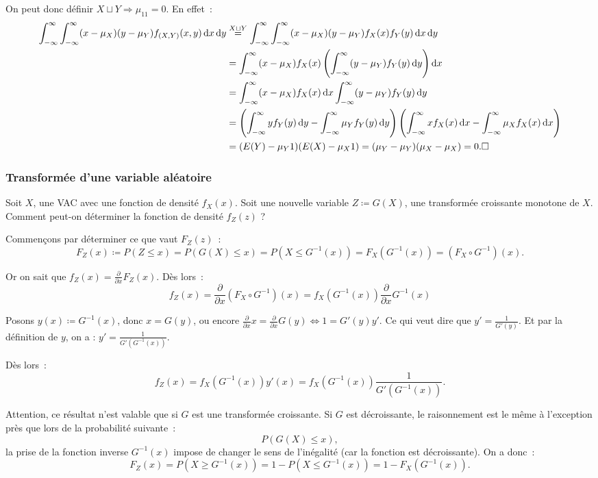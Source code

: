 \documentclass{article}
\renewcommand{\pd}[1]{\frac {\partial}{\partial #1}}
\begin{document}
			On peut donc définir $X \sqcup Y \Rightarrow \mu_{11} = 0$. En effet~:
			\begin{align*}
				\int_{-\infty}^\infty\int_{-\infty}^\infty(x-\mu_X)(y-\mu_Y)f_{(X, Y)}(x, y)\dif x\dif y &\stackrel{X \sqcup Y}{=}
					\int_{-\infty}^\infty\int_{-\infty}^\infty(x-\mu_X)(y-\mu_Y)f_X(x)f_Y(y)\dif x\dif y \\
				&= \int_{-\infty}^\infty(x-\mu_X)f_X(x)\left(\int_{-\infty}^\infty(y-\mu_Y)f_Y(y)\dif y\right)\dif x \\
				&= \int_{-\infty}^\infty(x-\mu_X)f_X(x)\dif x\int_{-\infty}^\infty(y-\mu_Y)f_Y(y)\dif y \\
				&= \left(\int_{-\infty}^\infty y f_Y(y)\dif y - \int_{-\infty}^\infty\mu_Yf_Y(y)\dif y\right)\left(\int_{-\infty}^\infty x f_X(x)\dif x - \int_{-\infty}^\infty\mu_Xf_X(x)\dif x\right) \\
				&= (E(Y) - \mu_Y1)(E(X) - \mu_X1) = (\mu_Y - \mu_Y)(\mu_X - \mu_X) = 0. \square
			\end{align*}

		\subsubsection{Transformée d'une variable aléatoire}
			Soit $X$, une VAC avec une fonction de densité $f_X(x)$. Soit une nouvelle variable $Z \coloneqq G(X)$, une transformée croissante monotone de $X$. Comment
			peut-on déterminer la fonction de densité $f_Z(z)$ ?

			Commençons par déterminer ce que vaut $F_Z(z)$~:
			\[F_Z(x) \coloneqq P(Z \leq x) = P(G(X) \leq x) = P(X \leq G^{-1}(x)) = F_X(G^{-1}(x)) = (F_X \circ G^{-1})(x).\]

			Or on sait que $f_Z(x) = \pd xF_Z(x)$. Dès lors~:
			\[f_Z(x) = \pd x(F_X \circ G^{-1})(x) = f_X(G^{-1}(x))\pd xG^{-1}(x)\]

			Posons $y(x) \coloneqq G^{-1}(x)$, donc $x = G(y)$, ou encore $\pd xx = \pd xG(y) \iff 1 = G'(y)y'$. Ce qui veut dire que $y' = \frac 1{G'(y)}$. Et par la
			définition de $y$, on a : $y' = \frac 1{G'(G^{-1}(x))}$.

			Dès lors~:
			\[f_Z(x) = f_X(G^{-1}(x))y'(x) = f_X(G^{-1}(x))\frac 1{G'(G^{-1}(x))}.\]

			Attention, ce résultat n'est valable que si $G$ est une transformée croissante. Si $G$ est décroissante, le raisonnement est le même à l'exception près que
			lors de la probabilité suivante~:
			\[P(G(X) \leq x),\]
			la prise de la fonction inverse $G^{-1}(x)$ impose de changer le sens de l'inégalité (car la fonction est décroissante). On a donc~:
			\[F_Z(x) = P(X \geq G^{-1}(x)) = 1 - P(X \leq G^{-1}(x)) = 1 - F_X(G^{-1}(x)).\]
\end{document}
